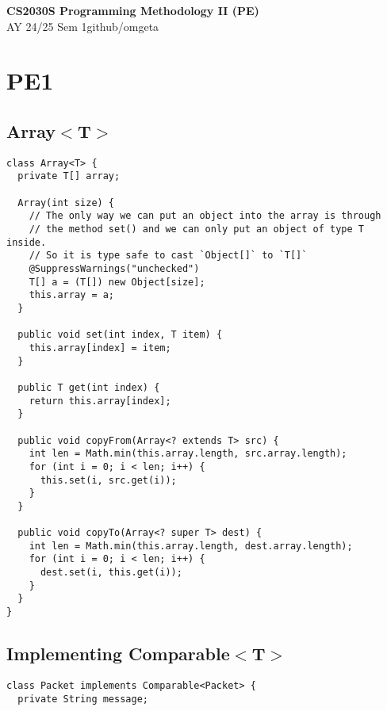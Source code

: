 \documentclass[12pt, a4paper]{article}
\newcommand{\mytitle}{CS2030S Programming Methodology II (PE)}
\newcommand{\myauthor}{github/omgeta}
\newcommand{\mydate}{AY 24/25 Sem 1}
\begin{document}
\raggedright
\footnotesize
\begin{multicols*}{2}
\setlength{\premulticols}{1pt}
\setlength{\postmulticols}{1pt}
\setlength{\multicolsep}{1pt}
\setlength{\columnsep}{2pt}

{\normalsize{\textbf{\mytitle}}} \\
{\footnotesize{\mydate\hspace{2pt}\textemdash\hspace{2pt}\myauthor}}

\section{PE1}
\subsection{Array$<$T$>$}
\begin{lstlisting}
class Array<T> {
  private T[] array;

  Array(int size) {
    // The only way we can put an object into the array is through
    // the method set() and we can only put an object of type T inside. 
    // So it is type safe to cast `Object[]` to `T[]`
    @SuppressWarnings("unchecked")
    T[] a = (T[]) new Object[size];
    this.array = a;
  }

  public void set(int index, T item) {
    this.array[index] = item;
  }

  public T get(int index) {
    return this.array[index];
  }

  public void copyFrom(Array<? extends T> src) {
    int len = Math.min(this.array.length, src.array.length);
    for (int i = 0; i < len; i++) {
      this.set(i, src.get(i));
    }
  }

  public void copyTo(Array<? super T> dest) {
    int len = Math.min(this.array.length, dest.array.length);
    for (int i = 0; i < len; i++) {
      dest.set(i, this.get(i));
    }
  }
}
\end{lstlisting}
\colbreak

\subsection{Implementing Comparable$<$T$>$}
\begin{lstlisting}
class Packet implements Comparable<Packet> {
  private String message;


\end{lstlisting}
\end{multicols*}
\end{document}
